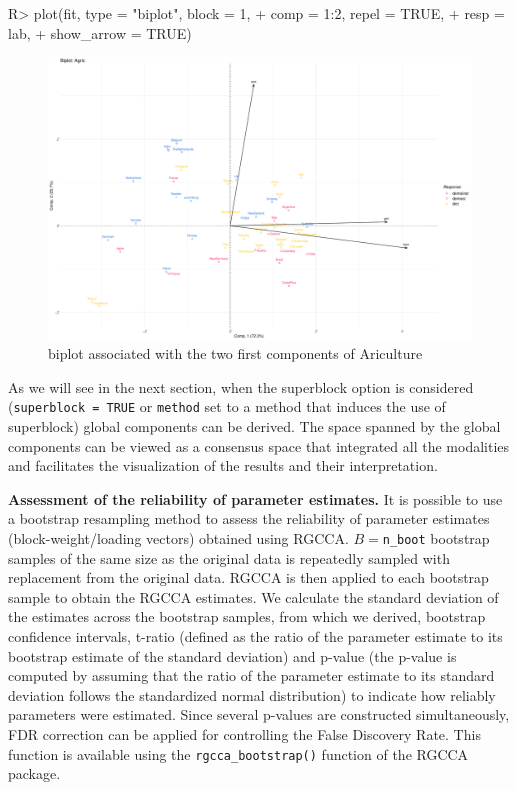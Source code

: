 \documentclass[
]{jss}
\begin{document}
\begin{CodeChunk}
\begin{CodeInput}
R> plot(fit, type = "biplot", block = 1, 
+      comp = 1:2, repel = TRUE, 
+      resp = lab, 
+      show_arrow = TRUE)
\end{CodeInput}
\begin{figure}

{\centering \includegraphics{RGCCA_21022023_files/figure-latex/unnamed-chunk-11-1} 

}

\caption[biplot associated with the two first components of Ariculture]{biplot associated with the two first components of Ariculture}\label{fig:unnamed-chunk-11}
\end{figure}
\end{CodeChunk}

\normalsize

As we will see in the next section, when the superblock option is
considered (\texttt{superblock\ =\ TRUE} or \texttt{method} set to a
method that induces the use of superblock) global components can be
derived. The space spanned by the global components can be viewed as a
consensus space that integrated all the modalities and facilitates the
visualization of the results and their interpretation.

\textbf{Assessment of the reliability of parameter estimates.} It is
possible to use a bootstrap resampling method to assess the reliability
of parameter estimates (block-weight/loading vectors) obtained using
RGCCA. \(B=\)\texttt{n\_boot} bootstrap samples of the same size as the
original data is repeatedly sampled with replacement from the original
data. RGCCA is then applied to each bootstrap sample to obtain the RGCCA
estimates. We calculate the standard deviation of the estimates across
the bootstrap samples, from which we derived, bootstrap confidence
intervals, t-ratio (defined as the ratio of the parameter estimate to
its bootstrap estimate of the standard deviation) and p-value (the
p-value is computed by assuming that the ratio of the parameter estimate
to its standard deviation follows the standardized normal distribution)
to indicate how reliably parameters were estimated. Since several
p-values are constructed simultaneously, FDR correction can be applied
for controlling the False Discovery Rate. This function is available
using the \texttt{rgcca\_bootstrap()} function of the RGCCA package.
\end{document}
